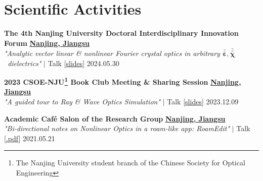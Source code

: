 
\section{Scientific Activities}
\label{Activities}
\begin{etaremune}[label={[\reversearabic*]},leftmargin=0.041\textwidth,itemsep=0pt]
	{\item \textbf{The 4th Nanjing University Doctoral Interdisciplinary Innovation Forum} \hfill \href{https://www.google.com/maps/place/\%E4\%B8\%AD\%E5\%9B\%BD\%E6\%B1\%9F\%E8\%8B\%8F\%E7\%9C\%81\%E5\%8D\%97\%E4\%BA\%AC\%E5\%B8\%82}{\textbf{Nanjing, Jiangsu}} \\ \textit{ "Analytic vector linear \& nonlinear Fourier crystal optics in arbitrary $\bar{\bar{\boldsymbol \varepsilon}}, \bar{\bar{\bar{\boldsymbol \chi}}}$ \!\! dielectrics"} $|$ {\color{color-detail} Talk} [\href{https://github.com/ChenZhu-Xie/PhD_academia/blob/master/2__Side_Projects/8.1__\%E5\%8D\%97\%E4\%BA\%AC\%E5\%A4\%A7\%E5\%AD\%A6\%E5\%8D\%9A\%E5\%A3\%AB\%E7\%94\%9F\%E5\%88\%9B\%E6\%96\%B0\%E8\%AE\%BA\%E5\%9D\%9B\%20talk\%20-\%20\%E4\%BB\%BB\%E6\%84\%8F\%20\%CE\%B5\%E2\%81\%BD\%C2\%B2\%E2\%81\%BE\%E3\%80\%81\%CF\%87\%E2\%81\%BD\%C2\%B3\%E2\%81\%BE\%20\%E7\%94\%B5\%E4\%BB\%8B\%E8\%B4\%A8\%20\%E4\%B8\%AD\%E7\%9A\%84\%20\%E8\%A7\%A3\%E6\%9E\%90\%E7\%9F\%A2\%E9\%87\%8F\%20\%E7\%BA\%BF\%E6\%80\%A7\%E3\%80\%81\%E9\%9D\%9E\%E7\%BA\%BF\%E6\%80\%A7\%20\%E5\%82\%85\%E7\%AB\%8B\%E5\%8F\%B6\%E5\%85\%89\%E5\%AD\%A6__4.0_year_-_2024.5.31.pdf}{\small slides}] \hfill 2024.05.30}
	{\item \textbf{2023 CSOE-NJU\footnote{The Nanjing University student branch of the Chinese Society for Optical Engineering} Book Club Meeting \& Sharing Session} \hfill \href{https://www.google.com/maps/place/\%E4\%B8\%AD\%E5\%9B\%BD\%E6\%B1\%9F\%E8\%8B\%8F\%E7\%9C\%81\%E5\%8D\%97\%E4\%BA\%AC\%E5\%B8\%82}{\textbf{Nanjing, Jiangsu}} \\ \textit{ "A guided tour to Ray \& Wave Optics Simulation"} $|$ {\color{color-detail} Talk} [\href{https://github.com/ChenZhu-Xie/PhD_academia/blob/master/2__Side_Projects/7.1__A_guided_tour_to_Ray_\%26_Wave_Optics_Simulation_\%E2\%86\%90_JavaScript\%2BPython__3.5_year_-_2023.12.9.pdf}{\small slides}] \hfill 2023.12.09}
	{\item \textbf{Academic Café Salon of the Research Group} \hfill \href{https://www.google.com/maps/place/\%E4\%B8\%AD\%E5\%9B\%BD\%E6\%B1\%9F\%E8\%8B\%8F\%E7\%9C\%81\%E5\%8D\%97\%E4\%BA\%AC\%E5\%B8\%82}{\textbf{Nanjing, Jiangsu}} \\ \textit{ "Bi-directional notes on Nonlinear Optics in a roam-like app: RoamEdit"} $|$ {\color{color-detail} Talk} [\href{https://github.com/ChenZhu-Xie/postgraduate_academia/blob/main/2__Side_Projects/2.1__Reading_Club\%EF\%BC\%9ANotes_with_Bi-directional_Links_in_RoamEdit__1.0_year_-_2021.5.21.pdf}{\small *.pdf}] \hfill 2021.05.21}
	{\item[] }
\end{etaremune}

